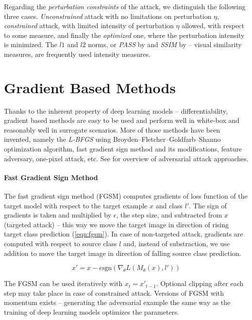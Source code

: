 Regarding the \emph{perturbation constraints} of the attack, we distinguish the following three cases. \emph{Unconstrained} attack with no limitations on perturbation $\eta$, \emph{constrained} attack, with limited intensity of perturbation $\eta$ allowed, with respect to some measure, and finally the \emph{optimized} one, where the perturbation intensity is minimized. The $l1$ and $l2$ norms, or \emph{PASS} by \cite{DBLP:journals/corr/RozsaRB16} and \emph{SSIM} by \cite{ssim} -- visual similarity measures, are frequently used intensity measures.

\section{Gradient Based Methods}
\label{sec:advex_gbm}
Thanks to the inherent property of deep learning models -- differentiability, gradient based methods are easy to be used and perform well in white-box and reasonably well in surrogate scenarios. More of those methods have been invented, namely the \emph{L-BFGS} using Broyden–Fletcher–Goldfarb–Shanno optimization algorithm, fast gradient sign method and its modifications, feature adversary, one-pixel attack, etc. See \cite{DBLP:journals/corr/abs-1712-07107} for overview of adversarial attack approaches.

\paragraph{Fast Gradient Sign Method}
\label{sec:fgsm}
The fast gradient sign method (FGSM) computes gradients of loss function of the target model  with respect to the target example $x$ and class $l'$. The sign of gradients is taken and multiplied by $\epsilon$, the step size, and subtracted from $x$ (targeted attack) -- this way we move the target image in direction of rising target class prediction (\ref{eqn:fgsm}). In case of non-targeted attack, gradients are computed with respect to source class $l$ and, instead of substraction, we use addition to move the target image in direction of falling source class prediction.

\begin{equation} \label{eqn:fgsm}
x' = x - \epsilon \text{sgn}\left(\nabla_\theta L\left(M_\theta(x), l'\right)\right)
\end{equation}

\noindent The FGSM can be used iteratively with $x_t = x'_{t-1}$. Optional clipping after each step may take place in case of constrained attack. Versions of FGSM with momentum exists -- generating the adversarial example the same way as the training of deep learning models optimizes the parameters.

